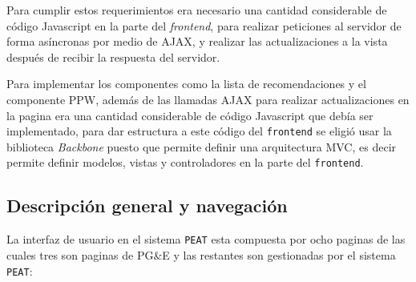 Para cumplir estos requerimientos era necesario una cantidad considerable
de código Javascript en la parte del \textit{frontend}, para realizar peticiones
al servidor de forma asíncronas por medio de AJAX, y realizar las actualizaciones
a la vista después de recibir la respuesta del servidor.

Para implementar los componentes como la lista de recomendaciones y el componente
PPW, además de las llamadas AJAX para realizar actualizaciones en la pagina era
una cantidad considerable de código Javascript que debía ser implementado, para
dar estructura a este código del \texttt{frontend} se eligió usar la biblioteca
\textit{Backbone} puesto que permite definir una arquitectura MVC, es decir
permite definir modelos, vistas y controladores en la parte del \texttt{frontend}.

\subsection{Descripción general y navegación}

La interfaz de usuario en el sistema \texttt{PEAT} esta compuesta por ocho paginas
de las cuales tres son paginas de PG\&E y las restantes son gestionadas por el
sistema \texttt{PEAT}:

